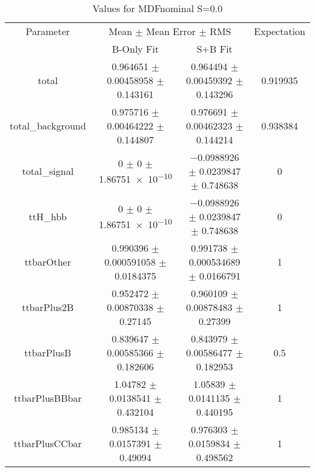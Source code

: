 \begin{table}
\centering
\caption{Values for MDFnominal S=0.0}
\begin{tabular}{cccc}
\toprule
Parameter & \multicolumn{2}{c}{Mean $\pm$ Mean Error $\pm$ RMS} & Expectation\\
 & B-Only Fit & S+B Fit & \\
\midrule
total & \num{0.964651} $\pm$ \num{0.00458958} $\pm$ \num{0.143161} & \num{0.964494} $\pm$ \num{0.00459392} $\pm$ \num{0.143296} & \num{0.919935}\\
total\_background & \num{0.975716} $\pm$ \num{0.00464222} $\pm$ \num{0.144807} & \num{0.976691} $\pm$ \num{0.00462323} $\pm$ \num{0.144214} & \num{0.938384}\\
total\_signal & \num{0} $\pm$ \num{0} $\pm$ \num{1.86751e-10} & \num{-0.0988926} $\pm$ \num{0.0239847} $\pm$ \num{0.748638} & \num{0}\\
ttH\_hbb & \num{0} $\pm$ \num{0} $\pm$ \num{1.86751e-10} & \num{-0.0988926} $\pm$ \num{0.0239847} $\pm$ \num{0.748638} & \num{0}\\
ttbarOther & \num{0.990396} $\pm$ \num{0.000591058} $\pm$ \num{0.0184375} & \num{0.991738} $\pm$ \num{0.000534689} $\pm$ \num{0.0166791} & \num{1}\\
ttbarPlus2B & \num{0.952472} $\pm$ \num{0.00870338} $\pm$ \num{0.27145} & \num{0.960109} $\pm$ \num{0.00878483} $\pm$ \num{0.27399} & \num{1}\\
ttbarPlusB & \num{0.839647} $\pm$ \num{0.00585366} $\pm$ \num{0.182606} & \num{0.843979} $\pm$ \num{0.00586477} $\pm$ \num{0.182953} & \num{0.5}\\
ttbarPlusBBbar & \num{1.04782} $\pm$ \num{0.0138541} $\pm$ \num{0.432104} & \num{1.05839} $\pm$ \num{0.0141135} $\pm$ \num{0.440195} & \num{1}\\
ttbarPlusCCbar & \num{0.985134} $\pm$ \num{0.0157391} $\pm$ \num{0.49094} & \num{0.976303} $\pm$ \num{0.0159834} $\pm$ \num{0.498562} & \num{1}\\
\bottomrule
\end{tabular}
\end{table}
